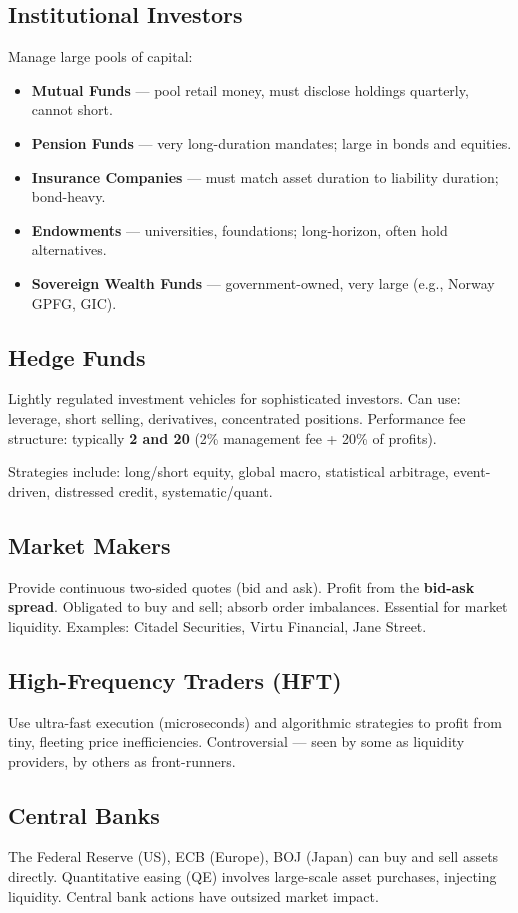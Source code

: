 \subsection{Institutional Investors}
Manage large pools of capital:
\begin{itemize}
  \item \textbf{Mutual Funds} — pool retail money, must disclose holdings quarterly, cannot short.
  \item \textbf{Pension Funds} — very long-duration mandates; large in bonds and equities.
  \item \textbf{Insurance Companies} — must match asset duration to liability duration; bond-heavy.
  \item \textbf{Endowments} — universities, foundations; long-horizon, often hold alternatives.
  \item \textbf{Sovereign Wealth Funds} — government-owned, very large (e.g., Norway GPFG, GIC).
\end{itemize}

\subsection{Hedge Funds}
Lightly regulated investment vehicles for sophisticated investors. Can use:
leverage, short selling, derivatives, concentrated positions. Performance fee structure:
typically \textbf{2 and 20} (2\% management fee + 20\% of profits).

Strategies include: long/short equity, global macro, statistical arbitrage, event-driven,
distressed credit, systematic/quant.

\subsection{Market Makers}
Provide continuous two-sided quotes (bid and ask). Profit from the \textbf{bid-ask spread}.
Obligated to buy and sell; absorb order imbalances. Essential for market liquidity.
Examples: Citadel Securities, Virtu Financial, Jane Street.

\subsection{High-Frequency Traders (HFT)}
Use ultra-fast execution (microseconds) and algorithmic strategies to profit from tiny,
fleeting price inefficiencies. Controversial — seen by some as liquidity providers, by
others as front-runners.

\subsection{Central Banks}
The Federal Reserve (US), ECB (Europe), BOJ (Japan) can buy and sell assets directly.
Quantitative easing (QE) involves large-scale asset purchases, injecting liquidity.
Central bank actions have outsized market impact.

